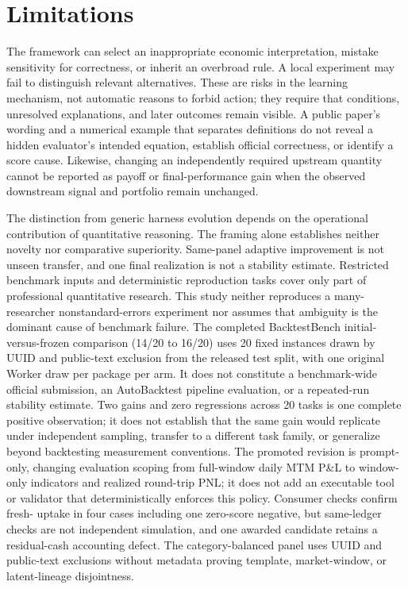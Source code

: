 \section{Limitations}

The framework can select an inappropriate economic interpretation, mistake
sensitivity for correctness, or inherit an overbroad rule.  A local experiment
may fail to distinguish relevant alternatives.  These are risks in the
learning mechanism, not automatic reasons to forbid action; they require that
conditions, unresolved explanations, and later outcomes remain visible.
A public paper's wording and a numerical example that separates definitions do
not reveal a hidden evaluator's intended equation, establish official
correctness, or identify a score cause.  Likewise, changing an independently
required upstream quantity cannot be reported as payoff or final-performance
gain when the observed downstream signal and portfolio remain unchanged.

The distinction from generic harness evolution depends on the operational
contribution of quantitative reasoning.  The framing alone establishes neither
novelty nor comparative superiority.  Same-panel adaptive improvement is not
unseen transfer, and one final realization is not a stability estimate.
Restricted benchmark inputs and deterministic reproduction tasks cover only
part of professional quantitative research.  This study neither reproduces a
many-researcher nonstandard-errors experiment nor assumes that ambiguity is the
dominant cause of benchmark failure.
The completed BacktestBench initial-versus-frozen comparison (14/20 to 16/20)
uses 20 fixed instances drawn by UUID and public-text exclusion from the
released test split, with one original Worker draw per package per arm.  It
does not constitute a benchmark-wide official submission, an AutoBacktest
pipeline evaluation, or a repeated-run stability estimate.  Two gains and zero
regressions across 20 tasks is one complete positive observation; it does not
establish that the same gain would replicate under independent sampling,
transfer to a different task family, or generalize beyond backtesting
measurement conventions.  The promoted revision is prompt-only, changing
evaluation scoping from full-window daily MTM P\&L to window-only indicators
and realized round-trip PNL; it does not add an executable tool or validator
that deterministically enforces this policy.  Consumer checks confirm
fresh-\Worker{} uptake in four cases including one zero-score negative, but
same-ledger checks are not independent simulation, and one awarded candidate
retains a residual-cash accounting defect.  The category-balanced panel uses
UUID and public-text exclusions without metadata proving template, market-window,
or latent-lineage disjointness.

